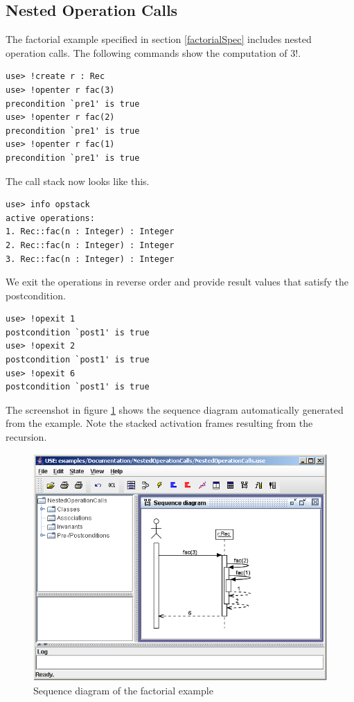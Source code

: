 \documentclass[a4paper,titlepage,oneside,final]{scrreprt} %
\begin{document}
\subsection{Nested Operation Calls}
The factorial example specified in section \ref{factorialSpec}
includes nested operation calls.
The following commands show the computation of 3!.
\begin{verbatim}
use> !create r : Rec
use> !openter r fac(3)
precondition `pre1' is true
use> !openter r fac(2)
precondition `pre1' is true
use> !openter r fac(1)
precondition `pre1' is true
\end{verbatim}
The call stack now looks like this.
\begin{verbatim}
use> info opstack
active operations:
1. Rec::fac(n : Integer) : Integer
2. Rec::fac(n : Integer) : Integer
3. Rec::fac(n : Integer) : Integer
\end{verbatim}
We exit the operations in reverse order and provide result values that satisfy the postcondition.
\begin{verbatim}
use> !opexit 1
postcondition `post1' is true
use> !opexit 2
postcondition `post1' is true
use> !opexit 6
postcondition `post1' is true
\end{verbatim}
The screenshot in figure \ref{fig:NestedSequence} shows the sequence
diagram automatically generated
from the example. Note the stacked activation frames
resulting from the recursion.
\begin{figure}[ht]
\centering
\includegraphics[scale=0.7]{Screenshots/GUI/NestedSequence.png}
\caption{Sequence diagram of the factorial example}
\label{fig:NestedSequence}
\end{figure}
\end{document}
